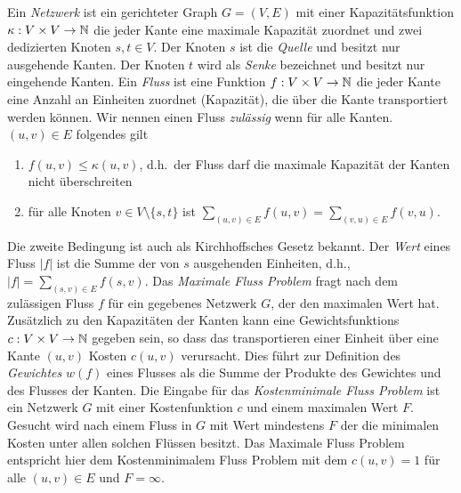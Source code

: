 Ein \emph{Netzwerk} ist ein gerichteter Graph $G=(V,E)$ mit 
einer Kapazitätsfunktion $\kappa: V \times V \rightarrow \operatorname{\mathbb{N}}$ 
die jeder Kante eine maximale Kapazität zuordnet und zwei 
dedizierten Knoten $s,t \in V$. Der Knoten $s$ ist die 
\emph{Quelle} und besitzt nur ausgehende Kanten. Der Knoten 
$t$ wird als \emph{Senke} bezeichnet und besitzt nur eingehende 
Kanten. Ein \emph{Fluss} ist eine Funktion 
$f: V \times V \rightarrow \operatorname{\mathbb{N}}$ die jeder Kante eine Anzahl 
an Einheiten zuordnet (Kapazität), die über die Kante 
transportiert werden können. Wir nennen einen Fluss 
\emph{zulässig} wenn für alle Kanten. $(u,v) \in E$ folgendes gilt
\begin{enumerate}
 \item $f(u,v) \leq \kappa(u,v)$, d.h.~der Fluss darf die 
 maximale Kapazität der Kanten nicht überschreiten
 \item für alle Knoten $v \in V\setminus \{s,t\}$ ist
 $\sum_{(u,v)\in E}f(u,v) = \sum_{(v,u)\in E}f(v,u)$. 
\end{enumerate}
Die zweite Bedingung ist auch als Kirchhoffsches Gesetz bekannt. 
Der \emph{Wert} eines Fluss $|f|$ ist die Summe der von $s$ 
ausgehenden Einheiten, d.h., $|f| = \sum_{(s,v) \in E}f(s,v)$. 
Das \emph{Maximale Fluss Problem} fragt nach dem zulässigen
Fluss $f$ für ein gegebenes Netzwerk $G$, der den maximalen 
Wert hat. Zusätzlich zu den Kapazitäten der Kanten kann eine
Gewichtsfunktions $c: V \times V \rightarrow \operatorname{\mathbb{N}}$ gegeben sein, 
so dass das transportieren einer Einheit über eine Kante $(u,v)$
Kosten $c(u,v)$ verursacht. Dies führt zur Definition des
\emph{Gewichtes} $w(f)$ eines Flusses als die Summe der 
Produkte des Gewichtes und des Flusses der Kanten. Die Eingabe 
für das \emph{Kostenminimale Fluss Problem} ist ein Netzwerk $G$ 
mit einer Kostenfunktion $c$ und einem maximalen Wert $F$. 
Gesucht wird nach einem Fluss in $G$ mit Wert mindestens $F$ 
der die minimalen Kosten unter allen solchen Flüssen besitzt.
Das Maximale Fluss Problem entspricht hier dem Kostenminimalem 
Fluss Problem mit dem $c(u,v) = 1$ für alle $(u,v) \in E$ 
und $F = \infty$. \cite{schoening, kripfganz, algo}